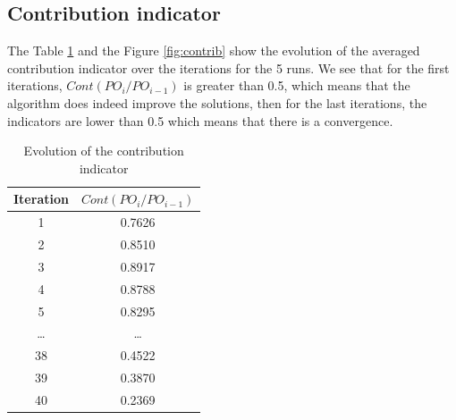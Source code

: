 \subsection{Contribution indicator}

The Table \ref{tab:contrib} and the Figure \ref{fig:contrib} show the evolution of the averaged contribution indicator over the iterations for the 5 runs. We see that for the first iterations, $Cont(PO_i/PO_{i-1})$ is greater than 0.5, which means that the algorithm does indeed improve the solutions, then for the last iterations, the indicators are lower than 0.5 which means that there is a convergence.

\begin{table}[h!]
\begin{center}
\begin{tabular}{|c|c|}
\hline Iteration & $Cont(PO_i/PO_{i-1})$ \\ 
\hline 1 & 0.7626 \\ 
\hline 2 & 0.8510 \\ 
\hline 3 & 0.8917 \\ 
\hline 4 & 0.8788 \\ 
\hline 5 & 0.8295 \\ 
\hline \dots & \dots \\
\hline 38 & 0.4522 \\
\hline 39 & 0.3870 \\ 
\hline 40 & 0.2369 \\
\hline 
\end{tabular} 
\end{center}
\caption{Evolution of the contribution indicator}
\label{tab:contrib}
\end{table}

